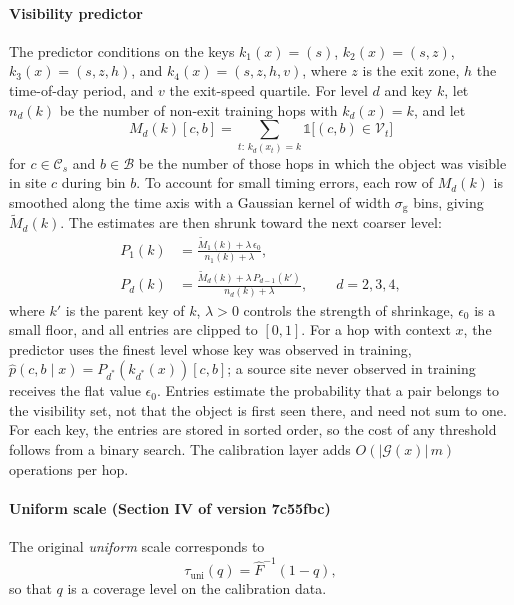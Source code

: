 \paragraph*{Visibility predictor}
The predictor conditions on the keys $k_1(x)=(s)$, $k_2(x)=(s,z)$,
$k_3(x)=(s,z,h)$, and $k_4(x)=(s,z,h,v)$, where $z$ is the exit zone, $h$ the
time-of-day period, and $v$ the exit-speed quartile. For level $d$ and key $k$, let $n_d(k)$ be the number of non-exit training hops
with $k_d(x)=k$, and let
\begin{equation}
  M_d(k)[c,b] = \sum_{t:\,k_d(x_t)=k} \mathbb{1}\bigl[(c,b)\in\mathcal{V}_t\bigr]
  \label{eq:counts}
\end{equation}
for $c\in\mathcal{C}_s$ and $b\in\mathcal{B}$ be the number of those hops in which
the object was visible in site $c$ during bin $b$. To account for small timing
errors, each row of $M_d(k)$ is smoothed along the time axis with a Gaussian
kernel of width $\sigma_{\mathrm{g}}$ bins, giving $\tilde{M}_d(k)$. The
estimates are then shrunk toward the next coarser level:
\begin{align}
  P_1(k) &= \frac{\tilde{M}_1(k) + \lambda\,\epsilon_0}{n_1(k)+\lambda},
  \label{eq:shrink1}\\
  P_d(k) &= \frac{\tilde{M}_d(k) + \lambda\,P_{d-1}(k')}{n_d(k)+\lambda},
  \qquad d=2,3,4,
  \label{eq:shrinkd}
\end{align}
where $k'$ is the parent key of $k$, $\lambda>0$ controls the strength of
shrinkage, $\epsilon_0$ is a small floor, and all entries are clipped to
$[0,1]$. For a hop with context $x$, the predictor uses the finest level whose key
was observed in training, $\hat{p}(c,b\mid x)=P_{d^\ast}(k_{d^\ast}(x))[c,b]$;
a source site never observed in training receives the flat value $\epsilon_0$.
Entries estimate the probability that a pair belongs to the visibility set, not
that the object is first seen there, and need not sum to one. For each key, the
entries are stored in sorted order, so the cost of any threshold follows from a
binary search. The calibration layer adds $O(|\mathcal{G}(x)|\,m)$ operations per
hop.

\paragraph*{Uniform scale (Section IV of version 7c55fbc)}
The original \emph{uniform} scale corresponds to
\begin{equation}
  \tau_{\mathrm{uni}}(q) = \hat{F}^{-1}(1-q),
  \label{eq:tau-uni}
\end{equation}
so that $q$ is a coverage level on the calibration data.

